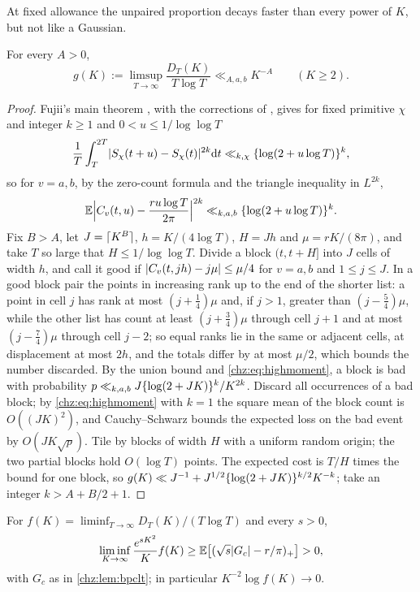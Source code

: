At fixed allowance the unpaired proportion decays faster than every power of $K$, but not like a Gaussian.

\begin{theorem}\label{chz:thm:rapid}
For every $A>0$,
\[
 g(K):=\limsup_{T\to\infty}\frac{D_T(K)}{T\log T}\ll_{A,a,b}K^{-A}\qquad(K\ge2).
\]
\end{theorem}

\begin{proof}
Fujii's main theorem \cite[pp.~225--226]{Fujii1974ZerosI}, with the corrections of \cite{Fujii1981ZerosII}, gives for
fixed primitive $\chi$ and integer $k\ge1$ and $0<u\le1/\log\log T$
\[
 \frac1T\int_T^{2T}\lvert S_\chi(t+u)-S_\chi(t)\rvert^{2k}\mathrm{d} t\ll_{k,\chi}\{\log(2+u\log T)\}^k,
\]
so for $v=a,b$, by the zero-count formula and the triangle inequality in $L^{2k}$,
\begin{equation}\label{chz:eq:highmoment}
 \mathbb{E}\Bigl\lvert C_v(t,u)-\frac{ru\log T}{2\pi}\Bigr\rvert^{2k}\ll_{k,a,b}\{\log(2+u\log T)\}^k .
\end{equation}
Fix $B>A$, let $J=\lceil K^B\rceil$, $h=K/(4\log T)$, $H=Jh$ and $\mu=rK/(8\pi)$, and take $T$ so large that
$H\le1/\log\log T$. Divide a block $(t,t+H]$ into $J$ cells of width $h$, and call it good if
$\lvert C_v(t,jh)-j\mu\rvert\le\mu/4$ for $v=a,b$ and $1\le j\le J$. In a good block pair the points in increasing rank up to
the end of the shorter list: a point in cell $j$ has rank at most $(j+\tfrac14)\mu$ and, if $j>1$, greater than
$(j-\tfrac54)\mu$, while the other list has count at least $(j+\tfrac34)\mu$ through cell $j+1$ and at most
$(j-\tfrac74)\mu$ through cell $j-2$; so equal ranks lie in the same or adjacent cells, at displacement at most $2h$,
and the totals differ by at most $\mu/2$, which bounds the number discarded. By the union bound and
\eqref{chz:eq:highmoment}, a block is bad with probability $p\ll_{k,a,b}J\{\log(2+JK)\}^k/K^{2k}$. Discard all
occurrences of a bad block; by \eqref{chz:eq:highmoment} with $k=1$ the square mean of the block count is
$O((JK)^2)$, and Cauchy--Schwarz bounds the expected loss on the bad event by $O(JK\sqrt p)$. Tile by blocks of
width $H$ with a uniform random origin; the two partial blocks hold $O(\log T)$ points. The expected cost is
$T/H$ times the bound for one block, so $g(K)\ll J^{-1}+J^{1/2}\{\log(2+JK)\}^{k/2}K^{-k}$; take an integer
$k>A+B/2+1$.
\end{proof}

\begin{theorem}\label{chz:thm:tails}
For $f(K)=\liminf_{T\to\infty}D_T(K)/(T\log T)$ and every $s>0$,
\[
 \liminf_{K\to\infty}\frac{e^{sK^2}}Kf(K)\ge\mathbb{E}\bigl[(\sqrt s\lvert G_c\rvert-r/\pi)_+\bigr]>0 ,
\]
with $G_c$ as in \cref{chz:lem:bpclt}; in particular $K^{-2}\log f(K)\to0$.
\end{theorem}

